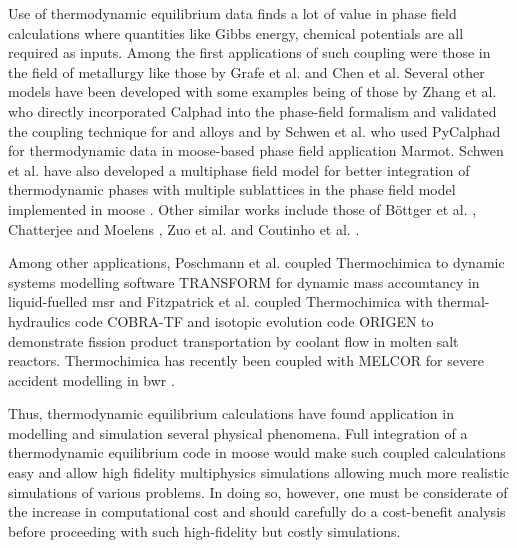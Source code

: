 	Use of thermodynamic equilibrium data finds a lot of value in phase field calculations where quantities like Gibbs energy, chemical potentials are all required as inputs. Among the first applications of such coupling were those in the field of metallurgy like those by Grafe et al. \cite{Grafe:2000aa} and Chen et al. \cite{Chen:2005aa} Several other models have been developed with some examples being of those by Zhang et al. \cite{Zhang:2015aa} who directly incorporated Calphad into the phase-field formalism and validated the coupling technique for  and  alloys and by Schwen et al. \cite{Schwen:2017aa} who used PyCalphad for thermodynamic data in  \gls{moose}-based phase field application Marmot. Schwen et al. have also developed a multiphase field model for better integration of thermodynamic phases with multiple sublattices in the phase field model implemented in \gls{moose} \cite{Schwen:2021aa}. Other similar works include those of B\"{o}ttger et al. \cite{Bottger:2020aa}, Chatterjee and Moelens \cite{Chatterjee:2021aa}, Zuo et al. \cite{Zuo:2021aa} and Coutinho et al. \cite{Coutinho:2022aa}.

	Among other applications, Poschmann et al. \cite{Poschmann:2022aa} coupled Thermochimica to dynamic systems modelling software TRANSFORM for dynamic mass accountancy in liquid-fuelled \gls{msr} and  Fitzpatrick et al. \cite{Fitzpatrick18} coupled Thermochimica with thermal-hydraulics code COBRA-TF and isotopic evolution code ORIGEN to demonstrate fission product transportation by coolant flow in molten salt reactors. Thermochimica has recently been coupled with MELCOR for severe accident modelling in \gls{bwr} \cite{Breeden:2022aa}.

	Thus, thermodynamic equilibrium calculations have found application in modelling and simulation several physical phenomena. Full integration of a thermodynamic equilibrium code in \gls{moose} would make such coupled calculations easy and allow high fidelity multiphysics simulations allowing much more realistic simulations of various problems. In doing so, however, one must be considerate of the increase in computational cost and should carefully do a cost-benefit analysis before proceeding with such high-fidelity but costly simulations.

